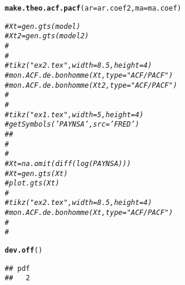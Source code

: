 \documentclass{article}\usepackage[]{graphicx}\usepackage[]{color}
\makeatletter
\newcommand{\hlcom}[1]{\textcolor[rgb]{0.678,0.584,0.686}{\textit{#1}}}%
\newcommand{\hlstd}[1]{\textcolor[rgb]{0.345,0.345,0.345}{#1}}%
\newcommand{\hlkwc}[1]{\textcolor[rgb]{0.333,0.667,0.333}{#1}}%
\newcommand{\hlkwd}[1]{\textcolor[rgb]{0.737,0.353,0.396}{\textbf{#1}}}%
\newenvironment{kframe}{%
 \def\at@end@of@kframe{}%
 \ifinner\ifhmode%
  \def\at@end@of@kframe{\end{minipage}}%
  \begin{minipage}{\columnwidth}%
 \fi\fi%
 \def\FrameCommand##1{\hskip\@totalleftmargin \hskip-\fboxsep
 \colorbox{shadecolor}{##1}\hskip-\fboxsep
     \hskip-\linewidth \hskip-\@totalleftmargin \hskip\columnwidth}%
 \MakeFramed {\advance\hsize-\width
   \@totalleftmargin\z@ \linewidth\hsize
   \@setminipage}}%
 {\par\unskip\endMakeFramed%
 \at@end@of@kframe}
\newenvironment{knitrout}{}{} %
\makeatother
\begin{document}
\begin{knitrout}
\begin{kframe}
{\ttfamily\noindent\color{warningcolor}{\#\# Warning: Removed 1 rows containing missing values (geom\_segment).}}\begin{alltt}
\hlkwd{make.theo.acf.pacf}\hlstd{(}\hlkwc{ar} \hlstd{= ar.coef2,} \hlkwc{ma} \hlstd{= ma.coef)}
\end{alltt}


{\ttfamily\noindent\bfseries\color{errorcolor}{\#\# Error in ARMAacf(ar = ar, ma = ma, lag.max = 30): object 'ar.coef2' not found}}\begin{alltt}
\hlcom{# Xt = gen.gts(model)}
\hlcom{# Xt2 = gen.gts(model2)}
\hlcom{# }
\hlcom{# }
\hlcom{# tikz("ex2.tex", width = 8.5, height = 4)}
\hlcom{# mon.ACF.de.bonhomme(Xt, type = "ACF/PACF")}
\hlcom{# mon.ACF.de.bonhomme(Xt2, type = "ACF/PACF")}
\hlcom{# }
\hlcom{# }
\hlcom{# tikz("ex1.tex", width = 5, height = 4)}
\hlcom{# getSymbols('PAYNSA',src='FRED')}
\hlcom{# #}
\hlcom{# }
\hlcom{# }
\hlcom{# Xt = na.omit(diff(log(PAYNSA)))}
\hlcom{# Xt = gen.gts(Xt)}
\hlcom{# plot.gts(Xt)}
\hlcom{# }
\hlcom{# tikz("ex2.tex", width = 8.5, height = 4)}
\hlcom{# mon.ACF.de.bonhomme(Xt, type = "ACF/PACF")}
\hlcom{# }
\hlcom{# }

\hlkwd{dev.off}\hlstd{()}
\end{alltt}
\begin{verbatim}
## pdf 
##   2
\end{verbatim}
\end{kframe}
\end{knitrout}

\begin{figure}

\end{figure}

% 

% 
\end{document}
